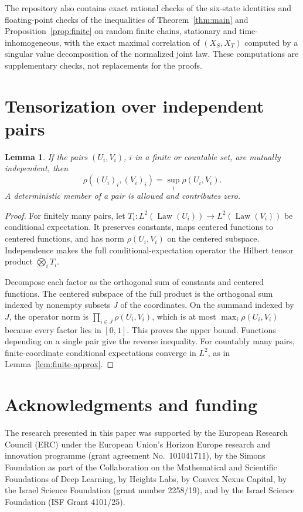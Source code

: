 \documentclass[11pt]{amsart}
\numberwithin{equation}{section}
\newtheorem{lemma}[theorem]{Lemma}
\theoremstyle{definition}
\newcommand{\Law}{\operatorname{Law}}
\begin{document}
The repository also contains exact rational checks of the six-state identities and floating-point checks of the inequalities of Theorem~\ref{thm:main} and Proposition~\ref{prop:finite} on random finite chains, stationary and time-inhomogeneous, with the exact maximal correlation of $(X_S,X_T)$ computed by a singular value decomposition of the normalized joint law. These computations are supplementary checks, not replacements for the proofs.

\appendix
\section{Tensorization over independent pairs}\label{app:independent}

\begin{lemma}\label{lem:independent-pairs}
If the pairs $(U_i,V_i)$, $i$ in a finite or countable set, are mutually independent, then
\[
\rho((U_i)_i,(V_i)_i)=\sup_i\rho(U_i,V_i).
\]
A deterministic member of a pair is allowed and contributes zero.
\end{lemma}

\begin{proof}
For finitely many pairs, let $T_i:L^2(\Law(U_i))\to L^2(\Law(V_i))$ be conditional expectation. It preserves constants, maps centered functions to centered functions, and has norm $\rho(U_i,V_i)$ on the centered subspace. Independence makes the full conditional-expectation operator the Hilbert tensor product $\bigotimes_iT_i$.

Decompose each factor as the orthogonal sum of constants and centered functions. The centered subspace of the full product is the orthogonal sum indexed by nonempty subsets $J$ of the coordinates. On the summand indexed by $J$, the operator norm is $\prod_{i\in J}\rho(U_i,V_i)$, which is at most $\max_i\rho(U_i,V_i)$ because every factor lies in $[0,1]$. This proves the upper bound. Functions depending on a single pair give the reverse inequality. For countably many pairs, finite-coordinate conditional expectations converge in $L^2$, as in Lemma~\ref{lem:finite-approx}.
\end{proof}

\section*{Acknowledgments and funding}
The research presented in this paper was supported by the European Research Council (ERC) under the European Union's Horizon Europe research and innovation programme (grant agreement No.~101041711), by the Simons Foundation as part of the Collaboration on the Mathematical and Scientific Foundations of Deep Learning, by Heights Labs, by Convex Nexus Capital, by the Israel Science Foundation (grant number 2258/19), and by the Israel Science Foundation (ISF Grant 4101/25).
\end{document}
